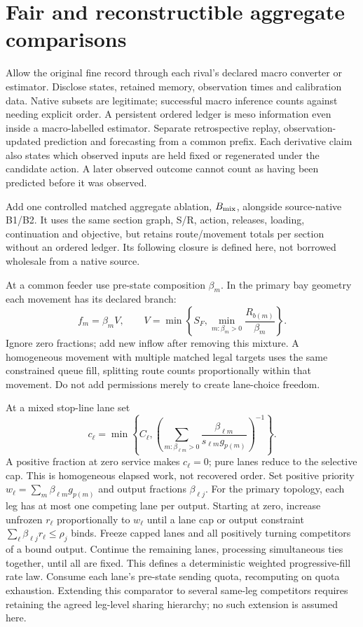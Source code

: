 \documentclass[10pt,a4paper]{article}
\begin{document}
\section{Fair and reconstructible aggregate comparisons}

Allow the original fine record through each rival's declared macro converter
or estimator. Disclose states, retained memory, observation times and
calibration data. Native subsets are legitimate; successful macro inference
counts against needing explicit order. A persistent ordered ledger is meso
information even inside a macro-labelled estimator. Separate retrospective
replay, observation-updated prediction and forecasting from a common prefix.
Each derivative claim also states which observed inputs are held fixed or
regenerated under the candidate action. A later observed outcome cannot
count as having been predicted before it was observed.

Add one controlled matched aggregate ablation, $B_{\rm mix}$, alongside
source-native B1/B2. It uses the same section graph, S/R, action, releases,
loading, continuation and objective, but retains route/movement totals per
section without an ordered ledger. Its following closure is defined here,
not borrowed wholesale from a native source.

At a common feeder use pre-state composition $\beta_m$. In the primary bay
geometry each movement has its declared branch:
\begin{equation}
 f_m=\beta_m V,\qquad
 V=\min\left\{S_F,\min_{m:\beta_m>0}\frac{R_{b(m)}}{\beta_m}\right\}.
 \label{eq:mix-fork-new}
\end{equation}
Ignore zero fractions; add new inflow after removing this mixture. A
homogeneous movement with multiple matched legal targets uses the same
constrained queue fill, splitting route counts proportionally within that
movement. Do not add permissions merely to create lane-choice freedom.

At a mixed stop-line lane set
\begin{equation}
 c_\ell=\min\left\{C_\ell,
 \left(\sum_{m:\beta_{\ell m}>0}
       \frac{\beta_{\ell m}}{s_{\ell m}g_{p(m)}}\right)^{-1}\right\}.
 \label{eq:mix-rate-new}
\end{equation}
A positive fraction at zero service makes $c_\ell=0$; pure lanes reduce to
the selective cap. This is homogeneous elapsed work, not recovered order.
Set positive priority
$w_\ell=\sum_m\beta_{\ell m}g_{p(m)}$ and output fractions $\beta_{\ell j}$.
For the primary topology, each leg has at most one competing lane per output.
Starting at zero, increase unfrozen $r_\ell$ proportionally to $w_\ell$
until a lane cap or output constraint
$\sum_\ell\beta_{\ell j}r_\ell\leq\rho_j$ binds. Freeze capped lanes and
all positively turning competitors of a bound output. Continue the remaining
lanes, processing simultaneous ties together, until all are fixed. This
defines a deterministic weighted progressive-fill rate law. Consume each
lane's pre-state sending quota, recomputing on quota exhaustion. Extending
this comparator to several same-leg competitors requires retaining the
agreed leg-level sharing hierarchy; no such extension is assumed here.
\end{document}
